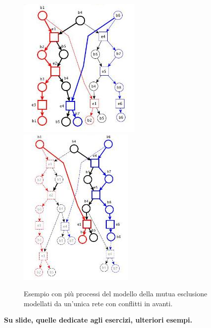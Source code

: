 \documentclass[a4paper,12pt, oneside]{book}
\begin{document}
\begin{figure}[H]
  \centering
  \includegraphics[scale = 0.6]{img/be4.jpg}
  \includegraphics[scale = 0.6]{img/be5.jpg} 
  \caption{Esempio con più processi del modello della mutua esclusione
    modellati da un’unica rete con conflitti in avanti.}
\end{figure}
\textbf{Su slide, quelle dedicate agli esercizi, ulteriori esempi.}
\end{document}
